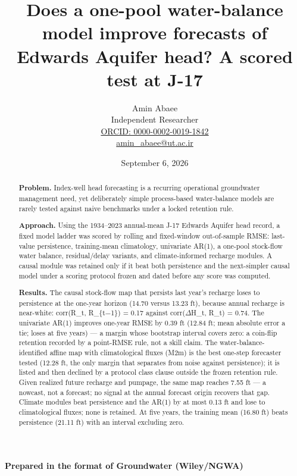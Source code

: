 \documentclass[11pt]{article}
\begin{document}
\title{Does a one-pool water-balance model improve forecasts of Edwards Aquifer head? A scored test at J-17}
\author{Amin Abaee\\[0.35em]
{\small Independent Researcher}\\[0.55em]
{\small\href{https://orcid.org/0000-0002-0019-1842}{ORCID: 0000-0002-0019-1842}}\\[0.3em]
{\small\href{mailto:amin\_abaee@ut.ac.ir}{amin\_abaee@ut.ac.ir}}}
\date{September 6, 2026}
\maketitle

{\centering\small \textbf{Prepared in the format of Groundwater (Wiley/NGWA)}\par}

\begin{abstract}


\textbf{Problem.} Index-well head forecasting is a recurring operational
groundwater management need, yet deliberately simple process-based
water-balance models are rarely tested against naive benchmarks under a
locked retention rule.

\textbf{Approach.} Using the 1934--2023 annual-mean J-17 Edwards Aquifer
head record, a fixed model ladder was scored by rolling and fixed-window
out-of-sample RMSE: last-value persistence, training-mean climatology,
univariate AR(1), a one-pool stock-flow water balance, residual/delay
variants, and climate-informed recharge modules. A causal module was
retained only if it beat both persistence and the next-simpler causal
model under a scoring protocol frozen and dated before any score was
computed.

\textbf{Results.} The causal stock-flow map that persists last year's
recharge loses to persistence at the one-year horizon (14.70 versus
13.23 ft), because annual recharge is near-white: corr(R\_t, R\_\{t\ensuremath{-}1\})
= 0.17 against corr(\ensuremath{\Delta}H\_t, R\_t) = 0.74. The univariate AR(1) improves
one-year RMSE by 0.39 ft (12.84 ft; mean absolute error a tie; loses at
five years) --- a margin whose bootstrap interval covers zero: a
coin-flip retention recorded by a point-RMSE rule, not a skill claim.
The water-balance-identified affine map with climatological fluxes (M2m)
is the best one-step forecaster tested (12.28 ft, the only margin that
separates from noise against persistence); it is listed and then
declined by a protocol class clause outside the frozen retention rule.
Given realized future recharge and pumpage, the same map reaches 7.55 ft
--- a nowcast, not a forecast; no signal at the annual forecast origin
recovers that gap. Climate modules beat persistence and the AR(1) by at
most 0.13 ft and lose to climatological fluxes; none is retained. At
five years, the training mean (16.80 ft) beats persistence (21.11 ft)
with an interval excluding zero.


\end{abstract}
\end{document}
